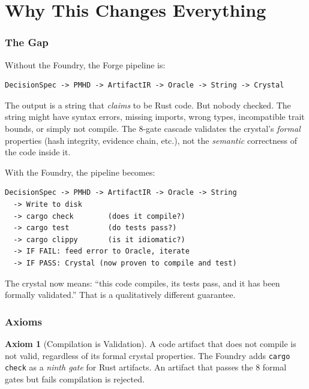 \documentclass[11pt,a4paper,twoside]{article}
\theoremstyle{definition}
\newtheorem{axiom}{Axiom}[section]
\theoremstyle{plain}
\theoremstyle{remark}
\begin{document}
\tableofcontents
\newpage


\part{Why This Changes Everything}\label{part:why}

\section{The Gap}\label{sec:gap}

Without the Foundry, the Forge pipeline is:
\begin{lstlisting}
DecisionSpec -> PMHD -> ArtifactIR -> Oracle -> String -> Crystal
\end{lstlisting}

The output is a string that \emph{claims} to be Rust code. But nobody
checked. The string might have syntax errors, missing imports, wrong
types, incompatible trait bounds, or simply not compile. The 8-gate
cascade validates the crystal's \emph{formal} properties (hash
integrity, evidence chain, etc.), not the \emph{semantic} correctness
of the code inside it.

With the Foundry, the pipeline becomes:
\begin{lstlisting}
DecisionSpec -> PMHD -> ArtifactIR -> Oracle -> String
  -> Write to disk
  -> cargo check        (does it compile?)
  -> cargo test         (do tests pass?)
  -> cargo clippy       (is it idiomatic?)
  -> IF FAIL: feed error to Oracle, iterate
  -> IF PASS: Crystal (now proven to compile and test)
\end{lstlisting}

The crystal now means: ``this code compiles, its tests pass, and it
has been formally validated.'' That is a qualitatively different
guarantee.


\section{Axioms}\label{sec:axioms}

\begin{axiom}[Compilation is Validation]\label{ax:compile}
A code artifact that does not compile is not valid, regardless of
its formal crystal properties. The Foundry adds \texttt{cargo check}
as a \emph{ninth gate} for Rust artifacts. An artifact that passes
the 8 formal gates but fails compilation is rejected.
\end{axiom}
\end{document}
